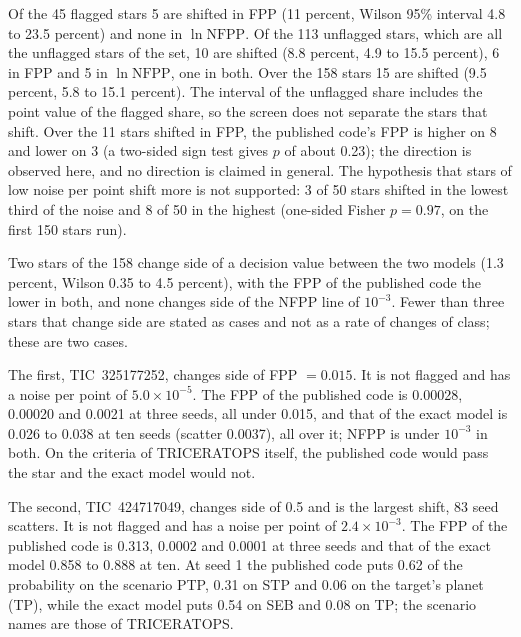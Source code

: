 \documentclass[11pt]{article}
\begin{document}
Of the 45 flagged stars 5 are shifted in FPP (11 percent, Wilson 95\% interval 4.8 to 23.5 percent) and none in $\ln\mathrm{NFPP}$. Of the 113 unflagged stars, which are all the unflagged stars of the set, 10 are shifted (8.8 percent, 4.9 to 15.5 percent), 6 in FPP and 5 in $\ln\mathrm{NFPP}$, one in both. Over the 158 stars 15 are shifted (9.5 percent, 5.8 to 15.1 percent). The interval of the unflagged share includes the point value of the flagged share, so the screen does not separate the stars that shift. Over the 11 stars shifted in FPP, the published code's FPP is higher on 8 and lower on 3 (a two-sided sign test gives $p$ of about 0.23); the direction is observed here, and no direction is claimed in general. The hypothesis that stars of low noise per point shift more is not supported: 3 of 50 stars shifted in the lowest third of the noise and 8 of 50 in the highest (one-sided Fisher $p=0.97$, on the first 150 stars run).

Two stars of the 158 change side of a decision value between the two models (1.3 percent, Wilson 0.35 to 4.5 percent), with the FPP of the published code the lower in both, and none changes side of the NFPP line of $10^{-3}$. Fewer than three stars that change side are stated as cases and not as a rate of changes of class; these are two cases.

The first, TIC~325177252, changes side of FPP $=0.015$. It is not flagged and has a noise per point of $5.0\times10^{-5}$. The FPP of the published code is 0.00028, 0.00020 and 0.0021 at three seeds, all under 0.015, and that of the exact model is 0.026 to 0.038 at ten seeds (scatter 0.0037), all over it; NFPP is under $10^{-3}$ in both. On the criteria of TRICERATOPS itself, the published code would pass the star and the exact model would not.

The second, TIC~424717049, changes side of 0.5 and is the largest shift, 83 seed scatters. It is not flagged and has a noise per point of $2.4\times10^{-3}$. The FPP of the published code is 0.313, 0.0002 and 0.0001 at three seeds and that of the exact model 0.858 to 0.888 at ten. At seed 1 the published code puts 0.62 of the probability on the scenario PTP, 0.31 on STP and 0.06 on the target's planet (TP), while the exact model puts 0.54 on SEB and 0.08 on TP; the scenario names are those of TRICERATOPS.
\end{document}
